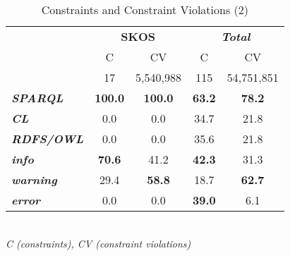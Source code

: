 \documentclass[conference]{IEEEtran}
\newcommand{\tb}[1]{\todo[size=\small, color=green!40]{\textbf{Thomas:} #1}}
\begin{document}
\begin{table}[H]
		\scriptsize
    \begin{center}
		\caption{Constraints and Constraint Violations (2)}
		\label{tab:evaluation-constraint-violations-2}
    \begin{tabular}{@{}lcccc@{}}
		\hline
    \multirow{2}{*}{} &
      \multicolumn{2}{c}{\textbf{SKOS}} &
      \multicolumn{2}{c}{\textbf{\emph{Total}}} \\
    \textbf{} & C & CV & C & CV \\
    \hline
		 & 17 & 5,540,988 & 115 & 54,751,851 \\
		\hline
		\textbf{\emph{SPARQL}} & \textbf{100.0} & \textbf{100.0} & \textbf{63.2} & \textbf{78.2} \\
		\textbf{\emph{CL}} & 0.0 & 0.0 & 34.7 & 21.8 \\
		\textbf{\emph{RDFS/OWL}} & 0.0 & 0.0 & 35.6 & 21.8 \\
		\hline
		\textbf{\emph{info}} & \textbf{70.6} & 41.2 & \textbf{42.3} & 31.3 \\
		\textbf{\emph{warning}} & 29.4 & \textbf{58.8} & 18.7 & \textbf{62.7} \\
		\textbf{\emph{error}} & 0.0 & 0.0 & \textbf{39.0} & 6.1\\
    \bottomrule
    \end{tabular}
    \\ \emph{C (constraints), CV (constraint violations)}
    \end{center}
\end{table}

\end{document}
